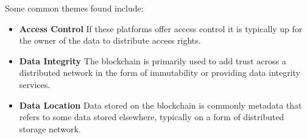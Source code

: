 \noindent
Some common themes found include:

\begin{itemize}
  \item \textbf{Access Control} If these platforms offer access control it is typically up for the owner of the data to distribute access rights. 
  \item \textbf{Data Integrity} The blockchain is primarily used to add trust across a distributed network in the form of immutability or providing data integrity services.
  \item \textbf{Data Location} Data stored on the blockchain is commonly metadata that refers to some data stored elsewhere, typically on a form of distributed storage network. 
\end{itemize}
